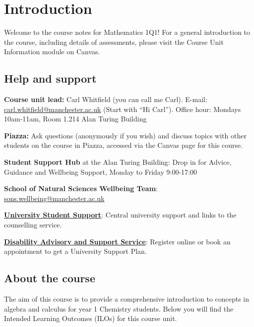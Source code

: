 \setcounter{section}{-1}

\maketitle
\tableofcontents

\section{Introduction}

Welcome to the course notes for Mathematics 1Q1! For a general introduction to the course, including details of assessments, please visit the Course Unit Information module on Canvas.

\subsection{Help and support}

\textbf{Course unit lead:} Carl Whitfield (you can call me Carl).\newline
E-mail: \href{mailto:carl.whitfield@manchester.ac.uk}{carl.whitfield@manchester.ac.uk} (Start with ``Hi Carl''). \newline
Office hour: Mondays 10am-11am, Room 1.214 Alan Turing Building

\textbf{Piazza:} Ask questions (anonymously if you wish) and discuss topics with other students on the course in Piazza, accessed via the Canvas page for this course.

\textbf{Student Support Hub} at the Alan Turing Building:\newline
Drop in for Advice, Guidance and Wellbeing Support, Monday to Friday 9:00-17:00

\textbf{School of Natural Sciences Wellbeing Team}: \href{mailto:sons.wellbeing@manchester.ac.uk}{sons.wellbeing@manchester.ac.uk}

\href{https://www.studentsupport.manchester.ac.uk/}{\textbf{University Student Support}}: Central university support and links to the counselling
service.

\href{https://www.dass.manchester.ac.uk/}{\textbf{Disability Advisory and Support Service}}: Register online or book an appointment to
get a University Support Plan.

\subsection{About the course}

The aim of this course is to provide a comprehensive introduction to concepts in algebra and calculus for year 1 Chemistry students. Below you will find the Intended Learning Outcomes (ILOs) for this course unit.

